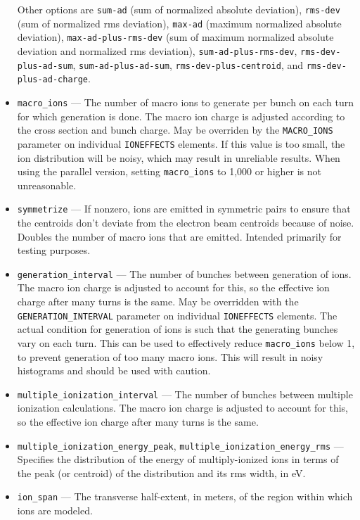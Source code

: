 \documentclass[11pt]{article}
\begin{document}
\begin{itemize}
  Other options are \verb|sum-ad| (sum of normalized absolute deviation), \verb|rms-dev| (sum of normalized rms deviation),
  \verb|max-ad| (maximum normalized absolute deviation), \verb|max-ad-plus-rms-dev| (sum of maximum normalized absolute 
  deviation and normalized rms deviation), \verb|sum-ad-plus-rms-dev|, \verb|rms-dev-plus-ad-sum|, \verb|sum-ad-plus-ad-sum|,
  \verb|rms-dev-plus-centroid|, and \verb|rms-dev-plus-ad-charge|.
\item \verb|macro_ions| --- The number of macro ions to generate per bunch on each turn for which generation is done. 
  The macro ion charge is adjusted
  according to the cross section and bunch charge. May be overriden by the \verb|MACRO_IONS| parameter on individual
  \verb|IONEFFECTS| elements.
  If this value is too small, the ion distribution will be noisy, which may result in unreliable results.
  When using the parallel version, setting \verb|macro_ions| to 1,000 or higher is not unreasonable.
\item \verb|symmetrize| --- If nonzero, ions are emitted in symmetric pairs to ensure that the centroids don't deviate
  from the electron beam centroids because of noise. Doubles the number of macro ions that are emitted. Intended primarily for
  testing purposes.
\item \verb|generation_interval| --- The number of bunches between generation of ions. The macro ion charge is adjusted
  to account for this, so the effective ion charge after many turns is the same. May be overridden with the
  \verb|GENERATION_INTERVAL| parameter on individual \verb|IONEFFECTS| elements. The actual condition for generation of
  ions is such that the generating bunches vary on each turn. This can be used to effectively reduce \verb|macro_ions|
  below 1, to prevent generation of too many macro ions.
  This will result in noisy histograms and should be used with caution.
\item \verb|multiple_ionization_interval| --- The number of bunches between multiple ionization calculations.  
      The macro ion charge is adjusted
      to account for this, so the effective ion charge after many turns is the same.
\item \verb|multiple_ionization_energy_peak|, \verb|multiple_ionization_energy_rms| --- Specifies the distribution of
  the energy of multiply-ionized ions in terms of the peak (or centroid) of the distribution and its rms width, in eV.
\item \verb|ion_span| --- The transverse half-extent, in meters, of the region within which ions are modeled.

\end{itemize}
\end{document}
